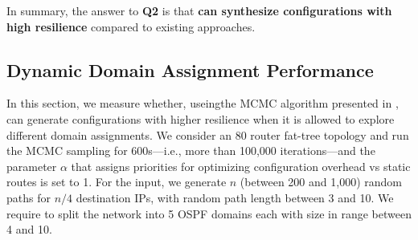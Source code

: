 \begin{figure}
	\centering
\end{figure}

In summary, the answer to \textbf{Q2} is that
\textbf{\name can synthesize configurations with high resilience} compared to existing approaches.


\subsection{Dynamic Domain Assignment Performance} \label{sec:mcmceval}

In this section, we measure whether,
useingthe MCMC algorithm presented in , 
\name can 
generate configurations
with higher resilience when it is allowed to explore different domain assignments.
We consider an 80 router fat-tree topology and run the MCMC sampling
for 600s---i.e., more than 100,000 iterations---and the parameter
$\alpha$ that assigns priorities for optimizing configuration overhead
vs static routes is set to 1. For the input, we generate $n$ (between
200 and 1,000) random paths for $n/4$ destination IPs, with random
path length between 3 and 10.  We require \name to split the network
into 5 OSPF domains each with size in range between 4 and 10.

